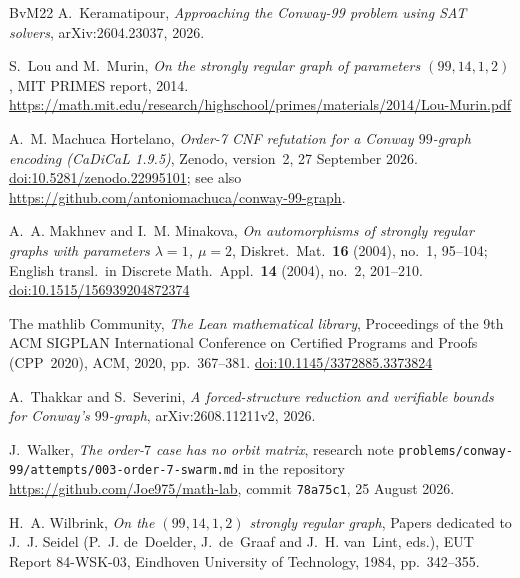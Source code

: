 \documentclass[11pt,a4paper]{amsart}
\theoremstyle{definition}
\theoremstyle{remark}
\begin{document}
\begin{thebibliography}{BvM22}
 A.~Keramatipour, \emph{Approaching the Conway-99 problem using SAT solvers},
arXiv:2604.23037, 2026.

 S.~Lou and M.~Murin, \emph{On the strongly regular graph of parameters $(99,14,1,2)$},
MIT PRIMES report, 2014.
\url{https://math.mit.edu/research/highschool/primes/materials/2014/Lou-Murin.pdf}

 A.~M. Machuca Hortelano, \emph{Order-7 CNF refutation for a Conway $99$-graph encoding
(CaDiCaL 1.9.5)}, Zenodo, version~2, 27 September 2026.
\href{https://doi.org/10.5281/zenodo.22995101}{doi:10.5281/zenodo.22995101}; see also
\url{https://github.com/antoniomachuca/conway-99-graph}.

 A.~A. Makhnev and I.~M. Minakova, \emph{On automorphisms of strongly regular graphs with
parameters $\lambda=1$, $\mu=2$}, Diskret.\ Mat.\ \textbf{16} (2004), no.~1, 95--104; English transl.\ in
Discrete Math.\ Appl.\ \textbf{14} (2004), no.~2, 201--210.
\href{https://doi.org/10.1515/156939204872374}{doi:10.1515/156939204872374}

 The mathlib Community, \emph{The Lean mathematical library}, Proceedings of the 9th ACM
SIGPLAN International Conference on Certified Programs and Proofs (CPP~2020), ACM, 2020, pp.~367--381.
\href{https://doi.org/10.1145/3372885.3373824}{doi:10.1145/3372885.3373824}

 A.~Thakkar and S.~Severini, \emph{A forced-structure reduction and verifiable bounds for
Conway's $99$-graph}, arXiv:2608.11211v2, 2026.

 J.~Walker, \emph{The order-$7$ case has no orbit matrix}, research note
\texttt{problems/conway-99/attempts/003-order-7-swarm.md} in the repository
\url{https://github.com/Joe975/math-lab}, commit \texttt{78a75c1}, 25 August 2026.

 H.~A. Wilbrink, \emph{On the $(99,14,1,2)$ strongly regular graph}, Papers dedicated to
J.~J. Seidel (P.~J. de~Doelder, J.~de~Graaf and J.~H. van~Lint, eds.), EUT Report 84-WSK-03, Eindhoven
University of Technology, 1984, pp.~342--355.

\end{thebibliography}
\end{document}
